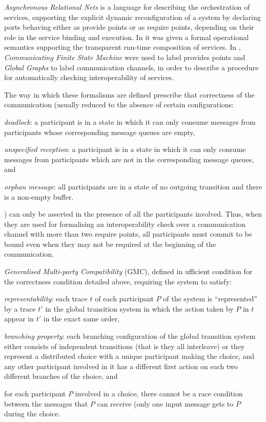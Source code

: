 \emph{Asynchronous Relational Nets} \cite{fiadeiro:fase2011} is a language for describing the orchestration of services, supporting the explicit dynamic reconfiguration of a system by declaring ports behaving either as provide points or as require points, depending on their role in the service binding and execution. In \cite{vissani:wadt14-f} it was given a formal operational semantics supporting the transparent run-time composition of services. In \cite{vissani:places15}, \emph{Communicating Finite State Machine} \cite{brand:jacm-30_2} were used to label provides points and \emph{Global Graphs} \cite{denielou:esop12} to label communication channels, in order to describe a procedure for automatically checking interoperability of services.

The way in which these formalisms are defined prescribe that correctness of the communication (usually reduced to the absence of certain configurations\cite{langle:popl15}:
\begin{inparaenum}[1)]
\item \emph{deadlock}: a participant is in a state in which it can only consume messages from participants whose corresponding message queues are empty,
\item \emph{unspecified reception}: a participant is in a state in which it can only consume messages from participants which are not in the corresponding message queues, and
\item \emph{orphan message}: all participants are in a state of no outgoing transition and there is a non-empty buffer.
\end{inparaenum}
) can only be asserted in the presence of all the participants involved. Thus, when they are used for formalising an interoperability check over a communication channel with more than two require points, all participants must commit to be bound even when they may not be required at the beginning of the communication.

\emph{Generalised Multi-party Compatibility} (GMC), defined in \cite{GMC}ufficient condition for the correctness condition detailed above, requiring the system to satisfy:
\begin{inparaenum}[1)]
\item \emph{representability}: each trace $t$ of each participant $P$ of the system is ``represented'' by a trace $t'$ in the global transition system in which the action taken by $P$ in $t$ appear in $t'$ in the exact same order, 
\item \emph{branching property}: each branching configuration of the global transition system either consists of independent transitions (that is they all interleave) or they represent a distributed choice with a unique participant making the choice, and any other participant involved in it has a different first action on each two different branches of the choice, and 
\item for each participant $P$ involved in a choice, there cannot be a race condition between the messages that $P$ can receive (only one input message gets to $P$ during the choice.
\end{inparaenum}

